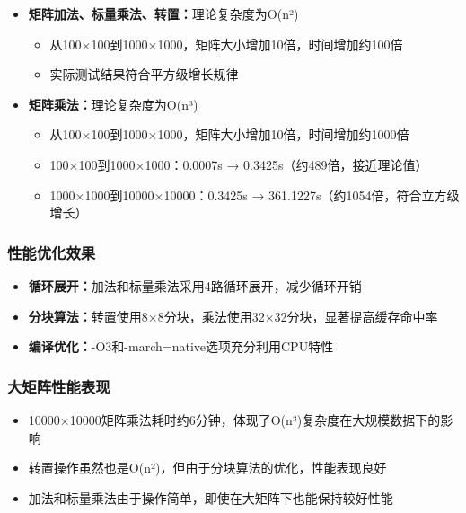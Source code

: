 \documentclass[12pt,a4paper]{article}
\begin{document}
\begin{itemize}
    \item \textbf{矩阵加法、标量乘法、转置：}理论复杂度为O(n²)
    \begin{itemize}
        \item 从100×100到1000×1000，矩阵大小增加10倍，时间增加约100倍
        \item 实际测试结果符合平方级增长规律
    \end{itemize}
    
    \item \textbf{矩阵乘法：}理论复杂度为O(n³)
    \begin{itemize}
        \item 从100×100到1000×1000，矩阵大小增加10倍，时间增加约1000倍
        \item 100×100到1000×1000：0.0007s → 0.3425s（约489倍，接近理论值）
        \item 1000×1000到10000×10000：0.3425s → 361.1227s（约1054倍，符合立方级增长）
    \end{itemize}
\end{itemize}

\subsubsection{性能优化效果}

\begin{itemize}
    \item \textbf{循环展开：}加法和标量乘法采用4路循环展开，减少循环开销
    \item \textbf{分块算法：}转置使用8×8分块，乘法使用32×32分块，显著提高缓存命中率
    \item \textbf{编译优化：}-O3和-march=native选项充分利用CPU特性
\end{itemize}

\subsubsection{大矩阵性能表现}

\begin{itemize}
    \item 10000×10000矩阵乘法耗时约6分钟，体现了O(n³)复杂度在大规模数据下的影响
    \item 转置操作虽然也是O(n²)，但由于分块算法的优化，性能表现良好
    \item 加法和标量乘法由于操作简单，即使在大矩阵下也能保持较好性能
\end{itemize}
\end{document}
